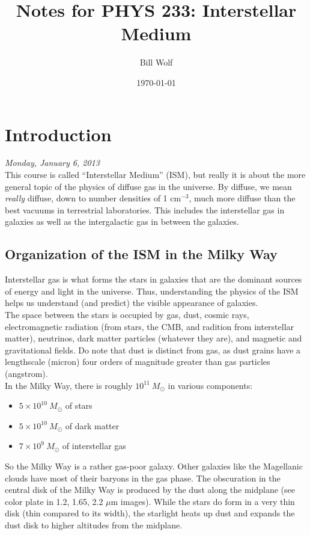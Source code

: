 \documentclass[10pt]{article}
\title{Notes for PHYS 233: Interstellar Medium}
\author{Bill Wolf}
\date{\today}
\numberwithin{equation}{section}
\newcommand{\n}{\noindent}
\begin{document}
\vfill\maketitle\vfill \newpage

\tableofcontents \newpage

\section{Introduction}
\emph{Monday, January 6, 2013}\\

\n This course is called ``Interstellar Medium'' (ISM), but really it is about
the more general topic of the physics of diffuse gas in the universe. By
diffuse, we mean \emph{really} diffuse, down to number densities of 1
cm$^{-3}$, much more diffuse than the best vacuums in terrestrial laboratories.
This includes the interstellar gas in galaxies as well as the intergalactic gas
in between the galaxies.

\subsection{Organization of the ISM in the Milky Way} %
\label{sub:a_first_look}
Interstellar gas is what forms the stars in galaxies that are the dominant
sources of energy and light in the universe. Thus, understanding the physics of
the ISM helps us understand (and predict) the visible appearance of galaxies.\\

\noindent The space between the stars is occupied by gas, dust, cosmic rays,
electromagnetic radiation (from stars, the CMB, and radition from interstellar
matter), neutrinos, dark matter particles (whatever they are), and magnetic and
gravitational fields. Do note that dust is distinct from gas, as dust grains
have a lengthscale (micron) four orders of magnitude greater than gas particles
(angstrom).\\

\noindent In the Milky Way, there is roughly $10^{11}\ M_\odot$ in various
components:
\begin{itemize}
  \item $5\times 10^{10}\ M_\odot$ of stars
  \item $5\times 10^{10}\ M_\odot$ of dark matter
  \item $7\times 10^{9}\ M_\odot$ of interstellar gas
\end{itemize}
So the Milky Way is a rather gas-poor galaxy. Other galaxies like the
Magellanic clouds have most of their baryons in the gas phase. The obscuration
in the central disk of the Milky Way is produced by the dust along the midplane
(see color plate in 1.2, 1.65, 2.2 $\mu$m images). While the stars do form in a
very thin disk (thin compared to its width), the starlight heats up dust and
expands the dust disk to higher altitudes from the midplane.\\
\end{document}
